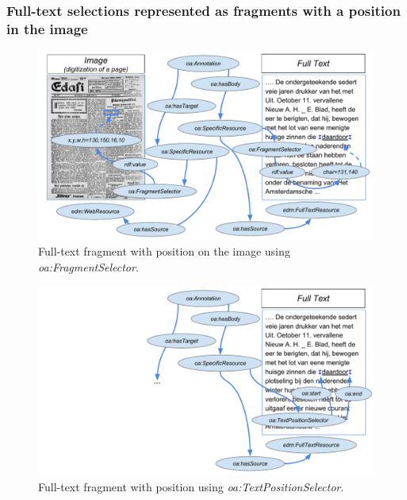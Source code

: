 \documentclass[a4paper,UKenglish,cleveref, autoref]{oasics-v2019}
\begin{document}
\subsubsection{Full-text selections represented as fragments with a position in the image}

\begin{figure}
    \centering
    \includegraphics{Fig4}
    \caption{Full-text fragment with position on the image using \emph{oa:FragmentSelector}.}\label{fig:fragmentselector}
\end{figure}

\begin{figure}
    \centering
    \includegraphics{Fig5}
    \caption{Full-text fragment with position using \emph{oa:TextPositionSelector}.}\label{fig:textpositionselector}
\end{figure}
\end{document}
